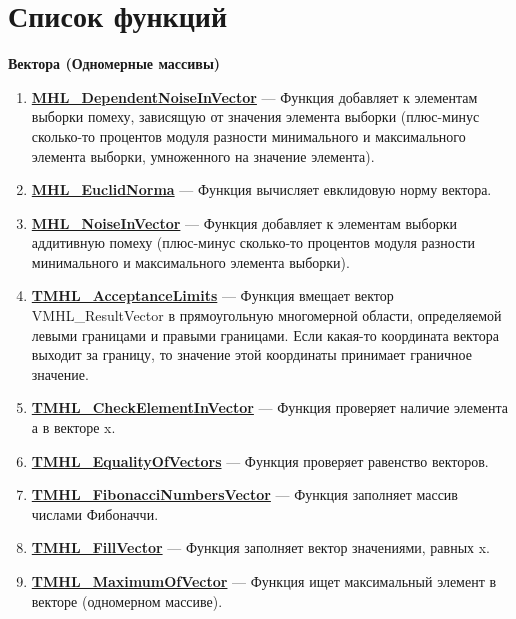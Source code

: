 \documentclass[a4paper,12pt]{article}
\begin{document}
\section{Список функций}\label{section_listfunctions}
\textbf{Вектора (Одномерные массивы)}
\begin{enumerate}

\item \textbf{\hyperref[MHL_DependentNoiseInVector]{MHL\_DependentNoiseInVector}} --- Функция добавляет к элементам выборки помеху, зависящую от значения элемента выборки (плюс-минус сколько-то процентов модуля разности минимального и максимального элемента выборки, умноженного на значение элемента).

\item \textbf{\hyperref[MHL_EuclidNorma]{MHL\_EuclidNorma}} --- Функция вычисляет евклидовую норму вектора.

\item \textbf{\hyperref[MHL_NoiseInVector]{MHL\_NoiseInVector}} --- Функция добавляет к элементам выборки аддитивную помеху (плюс-минус сколько-то процентов модуля разности минимального и максимального элемента выборки).

\item \textbf{\hyperref[TMHL_AcceptanceLimits]{TMHL\_AcceptanceLimits}} --- Функция вмещает вектор VMHL\_ResultVector в прямоугольную многомерной области, определяемой левыми границами и правыми границами. Если какая-то координата вектора выходит за границу, то значение этой координаты принимает граничное значение.

\item \textbf{\hyperref[TMHL_CheckElementInVector]{TMHL\_CheckElementInVector}} --- Функция проверяет наличие элемента а в векторе x.

\item \textbf{\hyperref[TMHL_EqualityOfVectors]{TMHL\_EqualityOfVectors}} --- Функция проверяет равенство векторов.

\item \textbf{\hyperref[TMHL_FibonacciNumbersVector]{TMHL\_FibonacciNumbersVector}} --- Функция заполняет массив числами Фибоначчи.

\item \textbf{\hyperref[TMHL_FillVector]{TMHL\_FillVector}} --- Функция заполняет вектор значениями, равных x.

\item \textbf{\hyperref[TMHL_MaximumOfVector]{TMHL\_MaximumOfVector}} --- Функция ищет максимальный элемент в векторе (одномерном массиве).


\end{enumerate}
\end{document}
